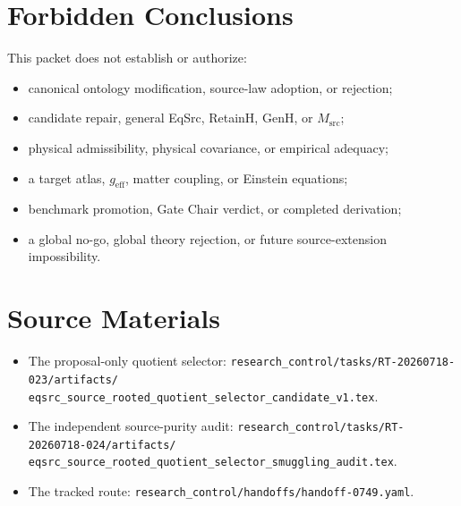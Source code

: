 \documentclass[11pt]{article}
\begin{document}
\section{Forbidden Conclusions}

This packet does not establish or authorize:
\begin{itemize}[leftmargin=*]
  \item canonical ontology modification, source-law adoption, or rejection;
  \item candidate repair, general EqSrc, RetainH, GenH, or \(M_{\mathrm{src}}\);
  \item physical admissibility, physical covariance, or empirical adequacy;
  \item a target atlas, \(g_{\mathrm{eff}}\), matter coupling, or Einstein
  equations;
  \item benchmark promotion, Gate Chair verdict, or completed derivation;
  \item a global no-go, global theory rejection, or future source-extension
  impossibility.
\end{itemize}

\section{Source Materials}

\begin{itemize}[leftmargin=*]
  \item The proposal-only quotient selector:
  \texttt{research\_control/tasks/RT-20260718-023/artifacts/}
  \texttt{eqsrc\_source\_rooted\_quotient\_selector\_candidate\_v1.tex}.
  \item The independent source-purity audit:
  \texttt{research\_control/tasks/RT-20260718-024/artifacts/}
  \texttt{eqsrc\_source\_rooted\_quotient\_selector\_smuggling\_audit.tex}.
  \item The tracked route:
  \texttt{research\_control/handoffs/handoff-0749.yaml}.
\end{itemize}
\end{document}
